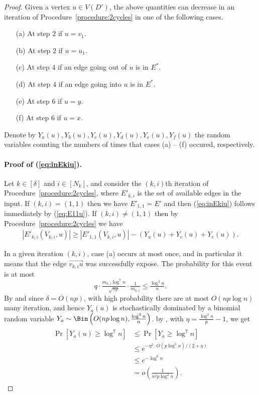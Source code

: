 \documentclass{article}
\begin{document}
\begin{proof}
		Given a vertex $u \in V(D')$, the above quantities can decrease in an iteration of Procedure~\ref{procedure:2cycles} in one of the following cases.
		\begin{enumerate}
			\item[(a)] At step $2$ if $u = v_1$.
			\item[(b)] At step $2$ if $u = u_1$.
			\item[(c)] At step $4$ if an edge going out of $u$ is in $E^*$.
			\item[(d)] At step $4$ if an edge going into $u$ is in $E^*$.
			\item[(e)] At step $6$ if $u=y$.
			\item[(f)] At step $6$ if $u=x$.
		\end{enumerate}
		Denote by $Y_a(u), Y_b(u), Y_c(u), Y_d(u), Y_e(u), Y_f(u)$ the random variables counting the numbers of times that cases (a) -- (f) occured, respectively.
		
		\paragraph*{Proof of (\ref{eq:inEkiu}).}
		Let $k \in [\delta]$ and $i \in [N_k]$, and consider the $(k,i)$th iteration of Procedure~\ref{procedure:2cycles}, where $E'_{k,i}$ is the set of available edges in the input.
		If $(k,i) = (1,1)$ then we have $E'_{1,1} = E'$ and then (\ref{eq:inEkiu}) follows immediately by (\ref{eq:E11u}).
		If $(k,i) \neq (1,1)$ then by Procedure~\ref{procedure:2cycles} we have
		\begin{align}
		\label{eq:inEk1-Y}
		\left|E'_{k,i}\left(V_{k,i}, u \right) \right| \ge \left|E'_{1,1}\left(V_{k,i}, u \right) \right| - \left(Y_a(u) + Y_c(u) + Y_e(u) \right).
		\end{align}
		
		In a given iteration $(k,i)$, case (a) occurs at most once, and in particular it means that the edge $\overrightarrow{v_{k,i} u}$ was successfully expose.
		The probability for this event is at most
		\[q\cdot \tfrac{m_{k,i} \log^7 n}{\sqrt{np}} \cdot \tfrac{1}{m_{k,i}} \le \tfrac{\log^3 n}{n}. \]
		By  and since $\delta = O(np)$, with high probability there are at most $O(np\log n)$ many iteration, and hence $Y_a(u)$ is stochastically dominated by a binomial random variable $Y_a \sim \Bin\left(O(np\log n), \frac{\log^3 n}{n} \right)$.
		by , with $\eta = \frac{\log^2 n}{p} -1$, we get
		\begin{align}
		\begin{split}
		\label{eq:casea}
		\Pr\left[Y_a(u) \ge \log^7 n \right] &\le \Pr\left[Y_a \ge \log^7 n \right] \\
		&\le e^{-\eta^2\cdot O(p\log^5 n)/(2+\eta)} \\
		&\le e^{-\log^6 n} \\
		&= o\left(\tfrac{1}{n^2p\log^2 n} \right).
		\end{split}
		\end{align}
		

\end{proof}
\end{document}
